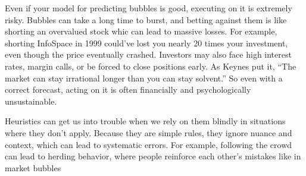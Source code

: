 \documentclass[12pt]{article}
\begin{document}
\begin{enumerate}
Even if your model for predicting bubbles is good, executing on it is extremely risky. Bubbles can take a long time to burst, and betting against them is like shorting an overvalued stock whic can lead to massive losses. For example, shorting InfoSpace in 1999 could’ve lost you nearly 20 times your investment, even though the price eventually crashed. Investors may also face high interest rates, margin calls, or be forced to close positions early. As Keynes put it, “The market can stay irrational longer than you can stay solvent.” So even with a correct forecast, acting on it is often financially and psychologically unsustainable.


Heuristics can get us into trouble when we rely on them blindly in situations where they don’t apply. Because they are simple rules, they ignore nuance and context, which can lead to systematic errors. For example, following the crowd can lead to herding behavior, where people reinforce each other’s mistakes like in market bubbles



\end{enumerate}


\end{document}
